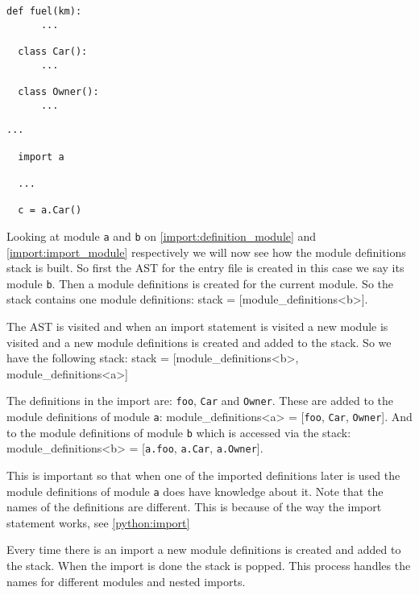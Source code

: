 \begin{lstlisting}[style=python, caption={A module that defines a function and two classes called \texttt{a}}, label={import:definition_module}]
  def fuel(km):
      ...

  class Car():
      ...

  class Owner():
      ...
\end{lstlisting}
\begin{lstlisting}[style=python, caption={A module called \texttt{b} importing the above module \texttt{a}}, label={import:import_module}]
  ...
  
  import a
  
  ...

  c = a.Car()
\end{lstlisting}


Looking at module \texttt{a} and \texttt{b} on \cref{import:definition_module} and \cref{import:import_module} respectively we will now see how the module definitions stack is built.
So first the AST for the entry file is created in this case we say its module \texttt{b}.
Then a module definitions is created for the current module.
So the stack contains one module definitions: stack = [module\_definitions<b>].

The AST is visited and when an import statement is visited a new module is visited and a new module definitions is created and added to the stack.
So we have the following stack: stack = [module\_definitions<b>, module\_definitions<a>]

The definitions in the import are: \texttt{foo}, \texttt{Car} and \texttt{Owner}.
These are added to the module definitions of module \texttt{a}: module\_definitions<a> = [\texttt{foo}, \texttt{Car}, \texttt{Owner}].
And to the  module definitions of module \texttt{b} which is accessed via the stack:  module\_definitions<b> = [\texttt{a.foo}, \texttt{a.Car}, \texttt{a.Owner}].

This is important so that when one of the imported definitions later is used the module definitions of module \texttt{a} does have knowledge about it.
Note that the names of the definitions are different.
This is because of the way the import statement works, see \cref{python:import}

Every time there is an import a new module definitions is created and added to the stack.
When the import is done the stack is popped.
This process handles the names for different modules and nested imports.
